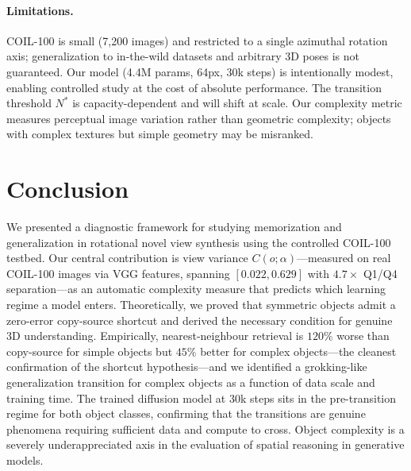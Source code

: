 \documentclass[11pt]{article}
\begin{document}
\paragraph{Limitations.}
COIL-100 is small (7,200 images) and restricted to a single azimuthal rotation
axis; generalization to in-the-wild datasets and arbitrary 3D poses is not
guaranteed. Our model (4.4M params, 64px, 30k steps) is intentionally modest,
enabling controlled study at the cost of absolute performance. The transition
threshold $N^*$ is capacity-dependent and will shift at scale. Our complexity
metric measures perceptual image variation rather than geometric complexity;
objects with complex textures but simple geometry may be misranked.

\section{Conclusion}
\label{sec:conclusion}

We presented a diagnostic framework for studying memorization and generalization
in rotational novel view synthesis using the controlled COIL-100 testbed. Our
central contribution is view variance $C(o;\alpha)$---measured on real COIL-100
images via VGG features, spanning $[0.022, 0.629]$ with $4.7\times$ Q1/Q4
separation---as an automatic complexity measure that predicts which learning
regime a model enters. Theoretically, we proved that symmetric objects admit a
zero-error copy-source shortcut and derived the necessary condition for genuine
3D understanding. Empirically, nearest-neighbour retrieval is $120\%$ worse
than copy-source for simple objects but $45\%$ better for complex
objects---the cleanest confirmation of the shortcut hypothesis---and we
identified a grokking-like generalization transition for complex objects as a
function of data scale and training time. The trained diffusion model at 30k
steps sits in the pre-transition regime for both object classes, confirming
that the transitions are genuine phenomena requiring sufficient data and
compute to cross. Object complexity is a severely underappreciated axis in the
evaluation of spatial reasoning in generative models.
\end{document}
